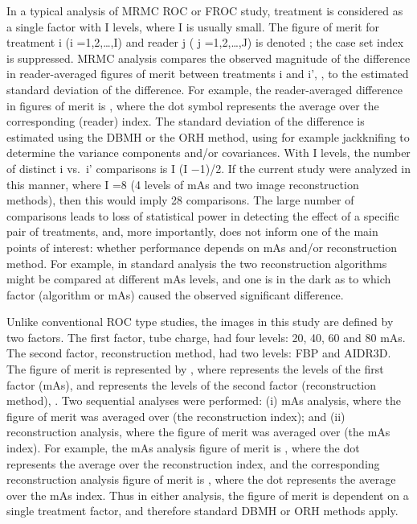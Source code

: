 \documentclass[
]{book}
\begin{document}
In a typical analysis of MRMC ROC or FROC study, treatment is considered as a single factor with I levels, where I is usually small. The figure of merit for treatment i (i =1,2,\ldots,I) and reader j ( j =1,2,\ldots,J) is denoted ; the case set index is suppressed. MRMC analysis compares the observed magnitude of the difference in reader-averaged figures of merit between treatments i and i', , to the estimated standard deviation of the difference. For example, the reader-averaged difference in figures of merit is , where the dot symbol represents the average over the corresponding (reader) index. The standard deviation of the difference is estimated using the DBMH or the ORH method, using for example jackknifing to determine the variance components and/or covariances. With I levels, the number of distinct i vs.~i' comparisons is I (I −1)/2. If the current study were analyzed in this manner, where I =8 (4 levels of mAs and two image reconstruction methods), then this would imply 28 comparisons. The large number of comparisons leads to loss of statistical power in detecting the effect of a specific pair of treatments, and, more importantly, does not inform one of the main points of interest: whether performance depends on mAs and/or reconstruction method. For example, in standard analysis the two reconstruction algorithms might be compared at different mAs levels, and one is in the dark as to which factor (algorithm or mAs) caused the observed significant difference.

Unlike conventional ROC type studies, the images in this study are defined by two factors. The first factor, tube charge, had four levels: 20, 40, 60 and 80 mAs. The second factor, reconstruction method, had two levels: FBP and AIDR3D. The figure of merit is represented by , where represents the levels of the first factor (mAs), and represents the levels of the second factor (reconstruction method), . Two sequential analyses were performed: (i) mAs analysis, where the figure of merit was averaged over (the reconstruction index); and (ii) reconstruction analysis, where the figure of merit was averaged over (the mAs index). For example, the mAs analysis figure of merit is , where the dot represents the average over the reconstruction index, and the corresponding reconstruction analysis figure of merit is , where the dot represents the average over the mAs index. Thus in either analysis, the figure of merit is dependent on a single treatment factor, and therefore standard DBMH or ORH methods apply.
\end{document}
